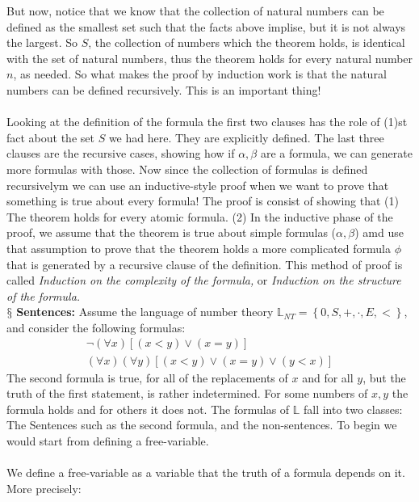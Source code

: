 \documentclass[9pt,a4paper, twocolumn]{article}
\newcounter{theo}
\newcommand{\newpoint}[1]{\ \\ \indent$\mathsection$ \textbf{#1}}
\newcommand{\curveL}{\mathbb{L} }
\begin{document}
        But now, notice that we know that the collection of natural numbers can be defined as the smallest set such that the facts above implise, but it is not always the largest. So $S$, the collection of numbers which the theorem holds, is identical with the set of natural numbers, thus the theorem holds for every natural number $n$, as needed. So what makes the proof by induction work is that the natural numbers can be defined recursively. This is an important thing!
        \\
        \\
        Looking at the definition of the formula the first two clauses has the role of (1)st fact about the set $S$ we had here. They are explicitly defined. The last three clauses are the recursive cases, showing how if $\alpha, \beta$ are a formula, we can generate more formulas with those. Now since the collection of formulas is defined recursivelym we can use an inductive-style proof when we want to prove that something is true about every formula! The proof is consist of showing that (1) The theorem holds for every atomic formula. (2) In the inductive phase of the proof, we assume that the theorem is true about simple formulas ($\alpha,\beta$) amd use that assumption to prove that the theorem holds a more complicated formula $\phi$ that is generated by a recursive clause of the definition. This method of proof is called \textit{Induction on the complexity of the formula,} or \textit{Induction on the structure of the formula.}
        \newpoint{Sentences:} Assume the language of number theory $\curveL_{NT} = \left\{0, S, +, \cdot, E, <\right\}$, and consider the following formulas:
        \begin{align*}
            \neg(\forall x)[(x<y)\lor(x=y)] \\ 
            (\forall x)(\forall y)[(x<y)\lor(x=y)\lor(y<x)]
        \end{align*}
        The second formula is true, for all of the replacements of $x$ and for all $y$, but the truth of the first statement, is rather indetermined. For some numbers of $x,y$ the formula holds and for others it does not. The formulas of $\curveL$ fall into two classes: The Sentences such as the second formula, and the non-sentences. To begin we would start from defining a free-variable.
        \\
        \\
        We define a free-variable as a variable that the truth of a formula depends on it. More precisely:
\end{document}

